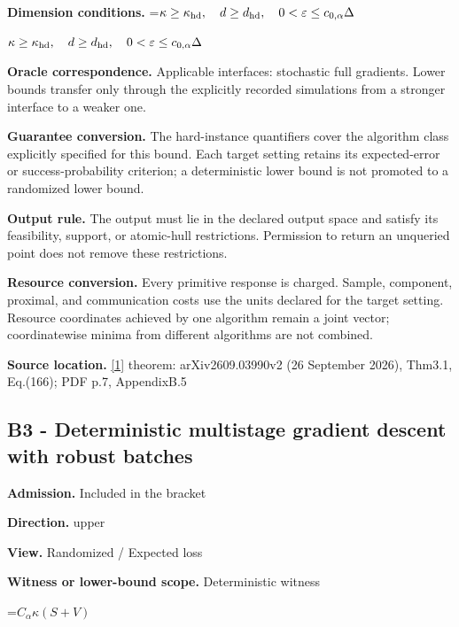 \documentclass[10pt,a4paper]{article}
\newcommand{\AtlasMath}[1]{\par\begingroup\centering\setbox0=\hbox{$\displaystyle #1$}\ifdim\wd0>1.4\linewidth\typeout{ATLAS WIDE FORMULA: \the\wd0}\fi\ifdim\wd0>\linewidth\resizebox{\linewidth}{!}{\box0}\else\box0\fi\par\endgroup}
\newcommand{\AtlasInlineMath}[1]{\begingroup\setbox0=\hbox{$#1$}\ifdim\wd0>.4\linewidth\endgroup\AtlasMath{#1}\else\endgroup$#1$\fi}
\begin{document}
\textbf{Dimension conditions.} \AtlasInlineMath{\kappa\ge\kappa_{\rm hd},\quad d\ge d_{\rm hd},\quad0<\varepsilon\le c_{0,\alpha}\Delta}



\textbf{Oracle correspondence.} Applicable interfaces: stochastic full gradients. Lower bounds transfer only through the explicitly recorded simulations from a stronger interface to a weaker one.



\textbf{Guarantee conversion.} The hard-instance quantifiers cover the algorithm class explicitly specified for this bound. Each target setting retains its expected-error or success-probability criterion; a deterministic lower bound is not promoted to a randomized lower bound.



\textbf{Output rule.} The output must lie in the declared output space and satisfy its feasibility, support, or atomic-hull restrictions. Permission to return an unqueried point does not remove these restrictions.



\textbf{Resource conversion.} Every primitive response is charged. Sample, component, proximal, and communication costs use the units declared for the target setting. Resource coordinates achieved by one algorithm remain a joint vector; coordinatewise minima from different algorithms are not combined.



\textbf{Source location.} \href{https://arxiv.org/pdf/2609.03990}{[1]} theorem: arXiv2609.03990v2 (26 September 2026), Thm3.1, Eq.(166); PDF p.7, AppendixB.5



\subsection{B3 - Deterministic multistage gradient descent with robust batches}


\textbf{Admission.} Included in the bracket



\textbf{Direction.} upper



\textbf{View.} Randomized / Expected loss



\textbf{Witness or lower-bound scope.} Deterministic witness



\AtlasMath{C_\alpha\kappa(S+V)}
\end{document}
